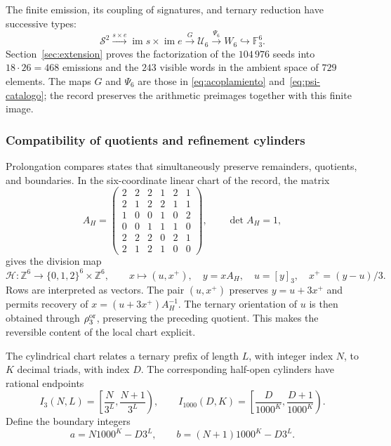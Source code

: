 




The finite emission, its coupling of signatures, and ternary reduction have
successive types:
\[
 \mathcal S^2\xrightarrow{s\times e}
 \operatorname{im}s\times\operatorname{im}e
 \xrightarrow{G}\mathcal U_6
 \xrightarrow{\Psi_6}W_6\hookrightarrow\mathbb F_3^6.
\]
Section~\ref{sec:extension} proves the factorization of the
\(104\,976\) seeds into \(18\cdot26=468\) emissions and the
\(243\) visible words in the ambient space of \(729\) elements. The
maps \(G\) and \(\Psi_6\) are those in
\eqref{eq:acoplamiento} and~\eqref{eq:psi-catalogo}; the record preserves
the arithmetic preimages together with this finite image.

\subsubsection{Compatibility of quotients and refinement cylinders}

Prolongation compares states that simultaneously preserve remainders,
quotients, and boundaries. In the six-coordinate linear chart of the record,
the matrix
\[
 A_H=\begin{pmatrix}
 2&2&2&1&2&1\\2&1&2&2&1&1\\1&0&0&1&0&2\\
 0&0&1&1&1&0\\2&2&2&0&2&1\\2&1&2&1&0&0
 \end{pmatrix},\qquad\det A_H=1,
\]
gives the division map
\begin{equation}
 \mathcal H:\mathbb Z^6\longrightarrow
 \{0,1,2\}^6\times\mathbb Z^6,\qquad
 x\longmapsto(u,x^+),\quad
 y=xA_H,\quad u=[y]_3,\quad x^+=(y-u)/3.
 \label{ii:tpk-hensel-local}
\end{equation}
Rows are interpreted as vectors. The pair \((u,x^+)\) preserves
\(y=u+3x^+\) and permits recovery of
\(x=(u+3x^+)A_H^{-1}\). The ternary orientation of \(u\) is then obtained
through \(\rho_3^{\rm or}\), preserving the preceding quotient.
This makes the reversible content of the local chart explicit.

The cylindrical chart relates a ternary prefix of length \(L\), with
integer index \(N\), to \(K\) decimal triads, with index \(D\).
The corresponding half-open cylinders have rational endpoints
\[
 I_3(N,L)=\left[\frac N{3^L},\frac{N+1}{3^L}\right),\qquad
 I_{1000}(D,K)=\left[\frac D{1000^K},\frac{D+1}{1000^K}\right).
\]
Define the boundary integers
\[
 a=N1000^K-D3^L,\qquad b=(N+1)1000^K-D3^L.
\]

